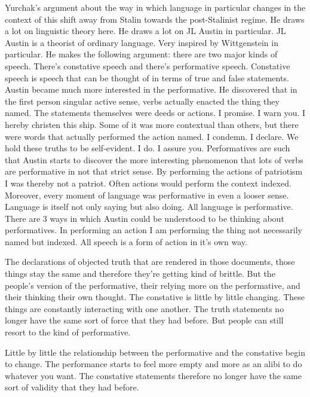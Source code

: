 \documentclass{article}
\begin{document}
Yurchak's argument about the way in which language in particular changes in the context of this shift away from Stalin towards the post-Stalinist regime.  He draws a lot on linguistic theory here.  He draws a lot on JL Austin in particular.  JL Austin is a theorist of ordinary language.  Very inspired by Wittgenstein in particular.  He makes the following argument: there are two major kinds of speech.  There's constative speech and there's performative speech.  Constative speech is speech that can be thought of in terms of true and false statements.  Austin became much more interested in the performative.  He discovered that in the first person singular active sense, verbs actually enacted the thing they named.  The statements themselves were deeds or actions.  I promise.  I warn you.  I hereby christen this ship.  Some of it was more contextual than others, but there were words that actually performed the action named.  I condemn.  I declare.  We hold these truths to be self-evident.  I do.  I assure you.  Performatives are such that Austin starts to discover the more interesting phenomenon that lots of verbs are performative in not that strict sense.  By performing the actions of patriotism I was thereby not a patriot.  Often actions would perform the context indexed.  Moreover, every moment of language was performative in even a looser sense.  Language is itself not only saying but also doing.  All language is performative.  There are 3 ways in which Austin could be understood to be thinking about performatives.  In performing an action I am performing the thing not necessarily named but indexed.  All speech is a form of action in it's own way.  

\vspace{3mm}

The declarations of objected truth that are rendered in those documents, those things stay the same and therefore they're getting kind of brittle.  But the people's version of the performative, their relying more on the performative, and their thinking their own thought.  The constative is little by little changing.  These things are constantly interacting with one another.  The truth statements no longer have the same sort of force that they had before.  But people can still resort to the kind of performative.  

\vspace{3mm}

Little by little the relationship between the performative and the constative begin to change.  The performance starts to feel more empty and more as an alibi to do whatever you want.  The constative statements therefore no longer have the same sort of validity that they had before.  
\end{document}
